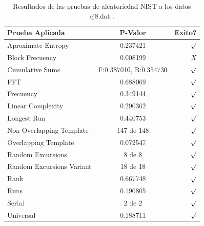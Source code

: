 \documentclass[10pt]{IEEEtran}
\begin{document}
\begin{table}[H]
\caption{Resultados de las pruebas de aleatoriedad NIST a los datos ej8.dat .}
\label{caso1}
\begin{center}
\begin{small}
\begin{tabular}{|l|c|r|}
\hline

Prueba Aplicada &  P-Valor & Exito? \\
\hline

Aproximate Entropy    &   0.237421  & $\surd$ \\

Block Frecuency  &   0.008199 &  $X$  \\

Cumulative Sums    &   F:0.387010, R:0.354730 & $\surd$ \\

FFT    &   0.688069 &  $\surd$     \\

Frecuency     &  0.349144 &  $\surd$   \\

Linear Complexity      & 0.290362 & $\surd$ \\

Longest Run      &  0.440753 &    $\surd$      \\

Non Overlapping Template      & 147 de 148    &     $\surd$          \\

Overlapping Template      &  0.072547  &      $\surd$      \\

Random Excursions      & 8 de 8  &    $\surd$      \\

Random Excursions Variant & 18 de 18 &     $\surd$    \\

Rank & 0.667748  &      $\surd$      \\

Runs &   0.190805  &     $\surd$        \\

Serial &     2 de 2    &     $\surd$        \\

Universal &   0.188711 &   $\surd$            \\

\hline

\end{tabular}
\end{small}
\end{center}
\end{table}
\end{document}
